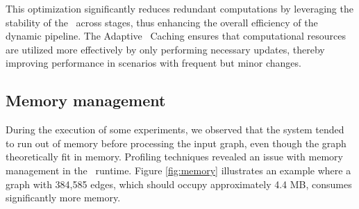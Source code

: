 This optimization significantly reduces redundant computations by leveraging the stability of the \mst\ across stages, thus enhancing the overall efficiency of the dynamic pipeline. The Adaptive \mst\ Caching ensures that computational resources are utilized more effectively by only performing necessary updates, thereby improving performance in scenarios with frequent but minor changes.

\subsection*{Memory management}

During the execution of some experiments, we observed that the system tended to run out of memory before processing the input graph, even though the graph theoretically fit in memory. Profiling techniques revealed an issue with memory management in the \Go\ runtime. Figure \ref{fig:memory} illustrates an example where a graph with 384,585 edges, which should occupy approximately 4.4 MB, consumes significantly more memory.

